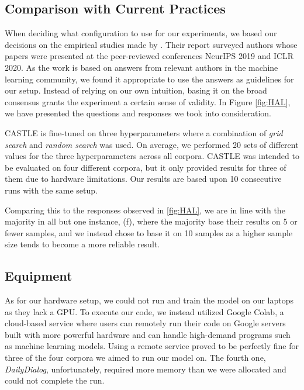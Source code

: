 \documentclass[nofilelist]{cslthse-msc}
\begin{document}
\subsection{Comparison with Current Practices}
When deciding what configuration to use for our experiments, we based our decisions on the empirical studies made by  \citet{bouthillier:hal-02447823}. Their report surveyed authors whose papers were presented at the peer-reviewed conferences NeurIPS 2019 and ICLR 2020. As the work is based on answers from relevant authors in the machine learning community, we found it appropriate to use the answers as guidelines for our setup. Instead of relying on our own intuition, basing it on the broad consensus grants the experiment a certain sense of validity. In Figure \ref{fig:HAL}, we have presented the questions and responses we took into consideration.

CASTLE is fine-tuned on three hyperparameters where a combination of \textit{grid search} and \textit{random search} was used. On average, we performed 20 sets of different values for the three hyperparameters across all corpora. CASTLE was intended to be evaluated on four different corpora, but it only provided results for three of them due to hardware limitations. Our results are based upon 10 consecutive runs with the same setup. 

Comparing this to the responses observed in \ref{fig:HAL}, we are in line with the majority in all but one instance, (f), where the majority base their results on 5 or fewer samples, and we instead chose to base it on 10 samples as a higher sample size tends to become a more reliable result.

\subsection{Equipment}
As for our hardware setup, we could not run and train the model on our laptops as they lack a GPU. To execute our code, we instead utilized Google Colab, a cloud-based service where users can remotely run their code on Google servers built with more powerful hardware and can handle high-demand programs such as machine learning models. Using a remote service proved to be perfectly fine for three of the four corpora we aimed to run our model on. The fourth one, \textit{DailyDialog}, unfortunately, required more memory than we were allocated and could not complete the run.


\end{document}

